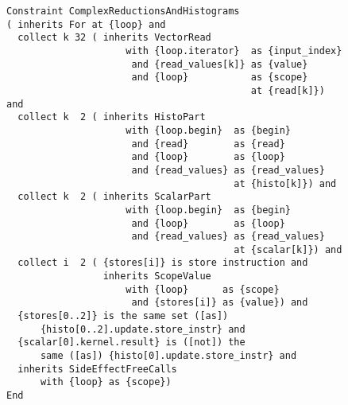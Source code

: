 \begin{figure}[h]
\begin{lstlisting}[language=IDL, captionpos=t, caption=
   {Constraint specification of Complex Reduction and Histogram Computations in
    IDL:
    The complete code is displayed with all dependencies, including the relevant
    definitions from the IDL standard library, which is derived in part from the
    CAnDL standard library as in Appendix~\ref{appendix:CAnDLpoly}.
    \parfillskip=0pt}]
Constraint ComplexReductionsAndHistograms
( inherits For at {loop} and
  collect k 32 ( inherits VectorRead
                     with {loop.iterator}  as {input_index}
                      and {read_values[k]} as {value}
                      and {loop}           as {scope}
                                           at {read[k]}) and
  collect k  2 ( inherits HistoPart
                     with {loop.begin}  as {begin}
                      and {read}        as {read}
                      and {loop}        as {loop}
                      and {read_values} as {read_values}
                                        at {histo[k]}) and
  collect k  2 ( inherits ScalarPart
                     with {loop.begin}  as {begin}
                      and {loop}        as {loop}
                      and {read_values} as {read_values}
                                        at {scalar[k]}) and
  collect i  2 ( {stores[i]} is store instruction and
                 inherits ScopeValue
                     with {loop}      as {scope}
                      and {stores[i]} as {value}) and
  {stores[0..2]} is the same set ([as])
      {histo[0..2].update.store_instr} and
  {scalar[0].kernel.result} is ([not]) the
      same ([as]) {histo[0].update.store_instr} and
  inherits SideEffectFreeCalls
      with {loop} as {scope})
End
\end{lstlisting}
\end{figure}
